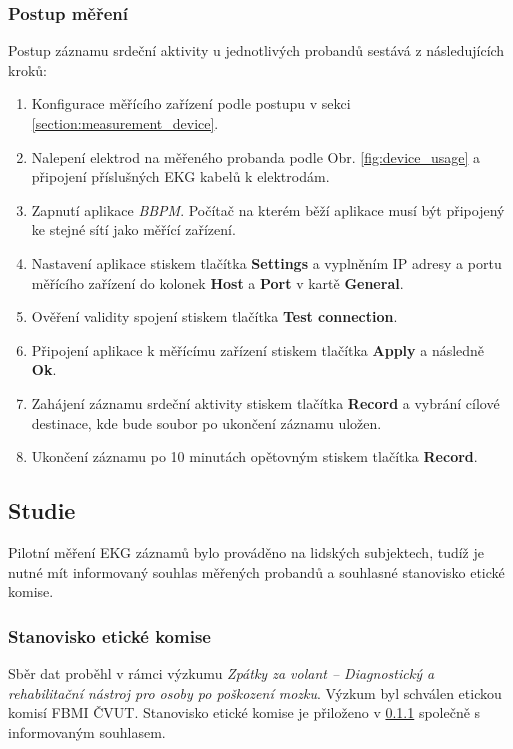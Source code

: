 \subsubsection{Postup měření}
\label{section:measurement_process}
Postup záznamu srdeční aktivity u jednotlivých probandů sestává z
následujících kroků:
\begin{enumerate}
    \item Konfigurace měřícího zařízení podle postupu v sekci
          \ref{section:measurement_device}.
    \item Nalepení elektrod na měřeného probanda podle Obr.
          \ref{fig:device_usage} a připojení příslušných EKG kabelů k elektrodám.
    \item Zapnutí aplikace \textit{BBPM}. Počítač na kterém běží aplikace musí
          být připojený ke stejné sítí jako měřící zařízení.
    \item Nastavení aplikace stiskem tlačítka \textbf{Settings} a vyplněním IP
          adresy a portu měřícího zařízení do kolonek \textbf{Host} a \textbf{Port} v
          kartě \textbf{General}.
    \item Ověření validity spojení stiskem tlačítka \textbf{Test connection}.
    \item Připojení aplikace k měřícímu zařízení stiskem tlačítka
          \textbf{Apply} a následně \textbf{Ok}.
    \item Zahájení záznamu srdeční aktivity stiskem tlačítka \textbf{Record} a
          vybrání cílové destinace, kde bude soubor po ukončení záznamu uložen.
    \item Ukončení záznamu po 10 minutách opětovným stiskem tlačítka \textbf{Record}.
\end{enumerate}

\subsection{Studie}
\label{section:study}
Pilotní měření EKG záznamů bylo prováděno na lidských subjektech, tudíž je nutné
mít informovaný souhlas měřených probandů a souhlasné stanovisko etické komise.

\subsubsection{Stanovisko etické komise}
Sběr dat proběhl v rámci výzkumu \textit{Zpátky za volant -- Diagnostický a
rehabilitační nástroj pro osoby po poškození mozku}. Výzkum byl schválen etickou
komisí FBMI ČVUT. Stanovisko etické komise je přiloženo v \ref{} společně s
informovaným souhlasem.


